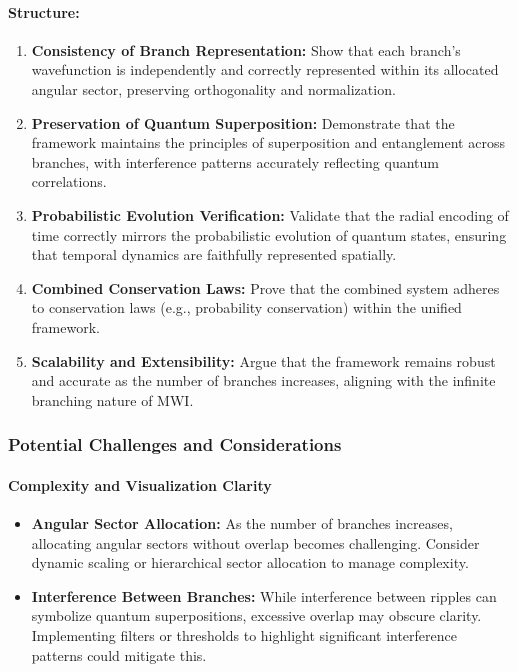 \documentclass[12pt]{article}
\begin{document}
\paragraph{Structure:}
\begin{enumerate}
    \item \textbf{Consistency of Branch Representation:}
    Show that each branch’s wavefunction is independently and correctly represented within its allocated angular sector, preserving orthogonality and normalization.
    
    \item \textbf{Preservation of Quantum Superposition:}
    Demonstrate that the framework maintains the principles of superposition and entanglement across branches, with interference patterns accurately reflecting quantum correlations.
    
    \item \textbf{Probabilistic Evolution Verification:}
    Validate that the radial encoding of time correctly mirrors the probabilistic evolution of quantum states, ensuring that temporal dynamics are faithfully represented spatially.
    
    \item \textbf{Combined Conservation Laws:}
    Prove that the combined system adheres to conservation laws (e.g., probability conservation) within the unified framework.
    
    \item \textbf{Scalability and Extensibility:}
    Argue that the framework remains robust and accurate as the number of branches increases, aligning with the infinite branching nature of MWI.
\end{enumerate}

\subsubsection{Potential Challenges and Considerations}

\paragraph{Complexity and Visualization Clarity}
\begin{itemize}
    \item \textbf{Angular Sector Allocation:} As the number of branches increases, allocating angular sectors without overlap becomes challenging. Consider dynamic scaling or hierarchical sector allocation to manage complexity.
    
    \item \textbf{Interference Between Branches:} While interference between ripples can symbolize quantum superpositions, excessive overlap may obscure clarity. Implementing filters or thresholds to highlight significant interference patterns could mitigate this.
\end{itemize}
\end{document}
